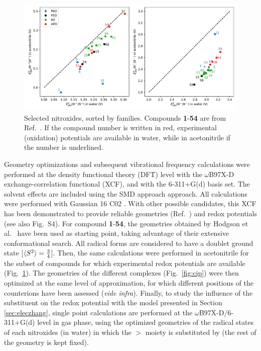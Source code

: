\documentclass[review,preprint]{elsarticle}
\begin{document}
\begin{figure}[!p]
\centering
\includegraphics[width=\linewidth]{Figure7}
\caption{Selected nitroxides, sorted by families. Compounds \textbf{1}-\textbf{54} are from Ref.~.  If the compound number is written in red, experimental (oxidation) potentials are available in water, while in acetonitrile if the number is underlined.}
\label{fig:nitroxides}
\end{figure}

Geometry optimizations and subsequent vibrational frequency calculations were performed at the density functional theory (DFT) level with the $\omega$B97X-D exchange-correlation functional (XCF), and with the 6-311+G(d)  basis set. The solvent effects are included using the SMD approach \cite{marenichUniversalSolvationModel2009} approach. All calculations were performed with Gaussian 16 C02 \cite{g16}. With other possible candidates, this XCF has been demonstrated to  provide reliable geometries (Ref.~) and redox potentials  \cite{flores-leonarFurtherInsightsDFT2017,maierG4AccuracyDFT2020} (see also Fig.~S4).  For compound \textbf{1}-\textbf{54}, the geometries obtained by Hodgson et al.~\cite{hodgsonOneElectronOxidationReduction2007} have been used as starting point, taking advantage of their extensive conformational search. All radical forms are considered to have a doublet ground state  [$\braket{S^2}=\frac{3}{4}$]. Then, the same calculations were performed in acetonitrile for the subset of compounds for which experimental redox potentials are available (Fig.~\ref{fig:nitroxides}). The geometries of the different complexes (Fig.~\ref{fig:cip}) were then optimized at the same level of approximation, for which different positions of the counterions have been assessed (\textit{vide infra}). Finally, to study the influence of the substituent on the redox potential with the model presented in Section \ref{sec:eleczhang}, single point calculations are performed at the $\omega$B97X-D/6-311+G(d) level in gas phase, using the optimized geometries of  the radical states of each nitroxides (in water) in which the  $>$ moiety is substituted by  (the rest of the geometry is kept fixed).
\end{document}
